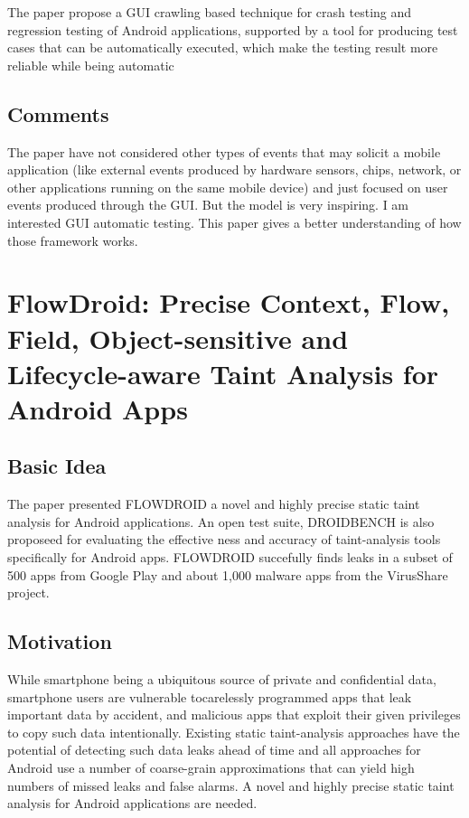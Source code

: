 \documentclass[a4paper]{article}
\begin{document}
      The paper propose a GUI crawling based technique for crash testing and regression testing of Android applications, supported by a tool for producing test cases that can be automatically executed, which make the testing result more reliable while being automatic
    
    \subsection{Comments}
    
      The paper have not considered other types of events that may solicit a mobile application (like external events produced by hardware sensors, chips, network, or other applications running on the same mobile device) and just focused on user events produced through the GUI. But the model is very inspiring. I am interested GUI automatic testing. This paper gives a better understanding of how those framework works.

  \section{FlowDroid: Precise Context, Flow, Field, Object-sensitive and Lifecycle-aware Taint Analysis for Android Apps}
    \subsection{Basic Idea}

      The paper presented F\textsc{LOW}D\textsc{ROID} a novel and highly precise static taint analysis for Android applications. An open test suite, D\textsc{ROID}B\textsc{ENCH} is also proposeed for evaluating the effective ness and accuracy of taint-analysis tools specifically for Android apps. F\textsc{LOW}D\textsc{ROID} succefully finds leaks in a subset of 500 apps from Google Play and about 1,000 malware apps from the VirusShare project.
    \subsection{Motivation}

      While smartphone being a ubiquitous source of private and confidential data, smartphone users are vulnerable tocarelessly programmed apps that leak important data by accident, and malicious apps that exploit their given privileges to copy such data intentionally. Existing static taint-analysis approaches have the potential of detecting such data leaks ahead of time and all approaches for Android use a number of coarse-grain approximations that can yield high numbers of missed leaks and false alarms. A novel and highly precise static taint analysis for Android applications are needed.
\end{document}
